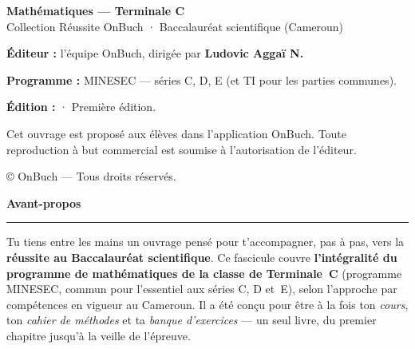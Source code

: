 
\usepackage{graphicx}





\frontmatter

\thispagestyle{empty}
\null\vfill
\noindent{\color{onbo}\rule{3cm}{2pt}}\par\vspace{8pt}
{\sffamily\bfseries\color{onbink} Mathématiques — Terminale C}\\[2pt]
{\sffamily\color{onbmuted} Collection Réussite OnBuch · Baccalauréat scientifique (Cameroun)}\par\vspace{12pt}
\noindent\small
\textbf{Éditeur :} l'équipe OnBuch, dirigée par \textbf{Ludovic Aggaï N.}\par\smallskip
\textbf{Programme :} MINESEC — séries C, D, E (et TI pour les parties communes).\par\smallskip
\textbf{Édition :} \the\year{} · Première édition.\par\vspace{10pt}
{\footnotesize\color{onbmuted} Cet ouvrage est proposé aux élèves dans l'application OnBuch.
Toute reproduction à but commercial est soumise à l'autorisation de l'éditeur.}
\par\vspace{6pt}
{\footnotesize\color{onbmuted}\copyright{} \the\year{} OnBuch — Tous droits réservés.}
\vfill
\clearpage

\thispagestyle{empty}
\vspace*{0.6cm}
{\sffamily\fontsize{30}{32}\selectfont\bfseries\color{onbink} Avant-propos}\par\vspace{4pt}
{\color{onbo}\rule{5cm}{2.5pt}}\par\vspace{16pt}

\noindent Tu tiens entre les mains un ouvrage pensé pour t'accompagner, pas à pas,
vers la \textbf{réussite au Baccalauréat scientifique}. Ce fascicule couvre
\textbf{l'intégralité du programme de mathématiques de la classe de Terminale~C}
(programme MINESEC, commun pour l'essentiel aux séries C, D et~E), selon
l'approche par compétences en vigueur au Cameroun. Il a été conçu pour être à la
fois ton \emph{cours}, ton \emph{cahier de méthodes} et ta \emph{banque
d'exercices} — un seul livre, du premier chapitre jusqu'à la veille de l'épreuve.

